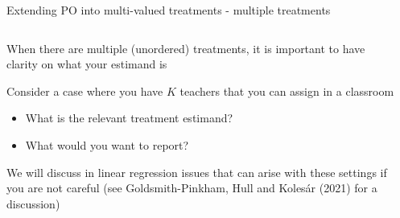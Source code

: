 \documentclass[notes,11pt, aspectratio=169]{beamer}
\newenvironment{wideitemize}{\itemize\addtolength{\itemsep}{10pt}}{\enditemize}
\begin{document}
\begin{frame}{Extending PO into multi-valued treatments - multiple treatments}
\begin{columns}[T] %
  \begin{column}{.6\textwidth}
    \begin{wideitemize}
    \item When there are multiple (unordered) treatments, it is
      important to have clarity on what your estimand is
    \item Consider a case where you have $K$ teachers that you can
      assign in a classroom
      \begin{itemize}
      \item What is the relevant treatment estimand?
      \item What would you want to report?
      \end{itemize}
      \pause 
    \item We will discuss in linear regression issues that can arise
      with these settings if you are not careful (see
      Goldsmith-Pinkham, Hull and Koles\'ar (2021) for a discussion)
\end{wideitemize}    

\end{column}%
  \hfill%
  \begin{column}{.4\textwidth}
  \end{column}
\end{columns}
\end{frame}
\end{document}
